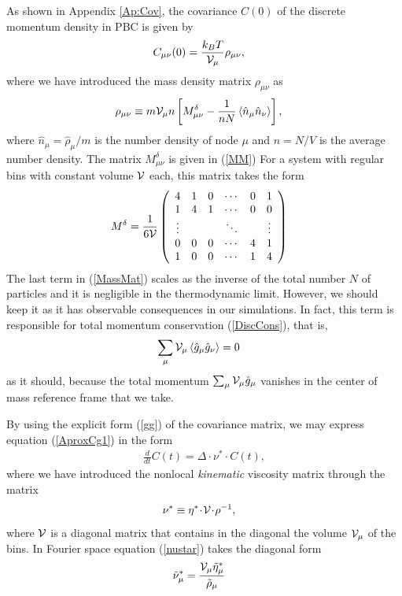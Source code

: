 \documentclass[b5paper,openright,10pt]{book}
\newcommand{\esc}{\!\cdot\!}
\newcommand{\llangle}{\left\langle}
\newcommand{\rrangle}{\right\rangle}
\begin{document}
As  shown  in Appendix  \ref{Ap:Cov},  the  covariance $C(0)$  of  the
discrete momentum density in PBC is given by
\begin{align}
C_{\mu\nu}(0)&= \frac{k_BT}{{\cal V}_\mu} \rho_{\mu\nu},
\label{gg}
\end{align}
where we have introduced the mass density matrix $\rho_{\mu\nu}$ as
\begin{align}
  \rho_{\mu\nu}&\equiv  m{\cal V}_\mu n \left[ M^\delta_{\mu\nu}-
\frac{1}{n N}  \llangle \hat{n}_\mu\hat{n}_\nu\rrangle\right],
\label{MassMat}
\end{align}
where  $\hat{n}_\mu=\hat{\rho}_\mu/m$ is  the number  density  of node $\mu$ and $n=N/V$  is the  average
number density.  The
matrix $M^\delta_{\mu\nu}$ is given in (\ref{MM})
For a system  with regular bins with constant volume  ${\cal V}$ each,
this matrix takes the form
\begin{align}
{M}^\delta&=\frac{1}{6{\cal V}}
\left(\begin{array}{cccccc}
4&1&0&\cdots &0&1\\
1&4&1&\cdots &0&0\\
\vdots&&&\ddots&&\vdots\\
0&0&0&\cdots &4&1\\
1&0&0&\cdots&1&4
\end{array}\right)
\end{align}
The last  term in (\ref{MassMat}) scales  as the inverse of  the total
number  $N$ of  particles and  it is  negligible in  the thermodynamic
limit.  However, we  should keep it as it  has observable consequences
in  our simulations.   In fact,  this  term is  responsible for  total
momentum conservation (\ref{DiscCons}), that is,
\begin{align}
  \sum_\mu{\cal V}_\mu\llangle \hat{g}_\mu\hat{g}_\nu\rrangle &=0
\end{align}
as   it   should,   because    the   total   momentum   $\sum_\mu{\cal
  V}_\mu\hat{g}_\mu$ vanishes  in the  center of mass  reference frame
that we take.

By using the explicit form (\ref{gg}) of the covariance matrix, we may
express equation (\ref{AproxCg1}) in the form
\begin{align}
\frac{d}{dt}C(t)= \Delta\esc \nu^*\esc C(t),
\label{SDECpi}
\end{align}
where we  have introduced  the nonlocal  \textit{kinematic} viscosity
matrix through the matrix
\begin{align}
\nu^*&\equiv  \eta^*\esc{\cal V}\esc \rho^{-1},
\label{nustar}
\end{align}
where ${\cal  V}$ is a diagonal  matrix that contains in  the diagonal
the volume ${\cal  V}_\mu$ of the bins.   In Fourier space equation (\ref{nustar})
takes the diagonal form
\begin{align}
  \tilde{\nu}_\mu^*&=  \frac{{\cal V}_\mu \tilde{\eta}_\mu^*}{\tilde{\rho}_\mu}
  \label{nustartilde}
\end{align}
\end{document}
